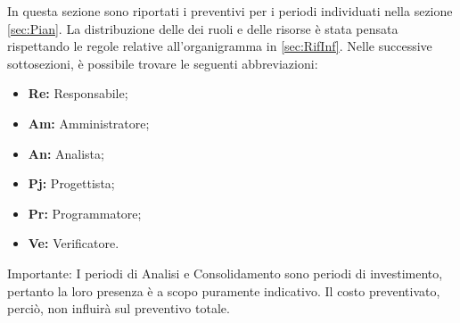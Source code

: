 In questa sezione sono riportati i preventivi per i periodi individuati nella sezione \cref{sec:Pian}. \newline
La distribuzione delle dei ruoli e delle risorse è stata pensata rispettando le regole relative all'organigramma in \cref{sec:RifInf}.\newline
Nelle successive sottosezioni, è possibile trovare le seguenti abbreviazioni:
\begin{itemize}
	\item \textbf{Re: }Responsabile;
	\item \textbf{Am: }Amministratore;
	\item \textbf{An: }Analista;
	\item \textbf{Pj: }Progettista;
	\item \textbf{Pr: }Programmatore;
	\item \textbf{Ve: }Verificatore.
\end{itemize}

\bigskip
\bigskip
Importante: I periodi di Analisi e Consolidamento sono {periodi di investimento}, pertanto la loro presenza è a scopo puramente indicativo. Il costo preventivato, perciò, non influirà sul preventivo totale.\newline
